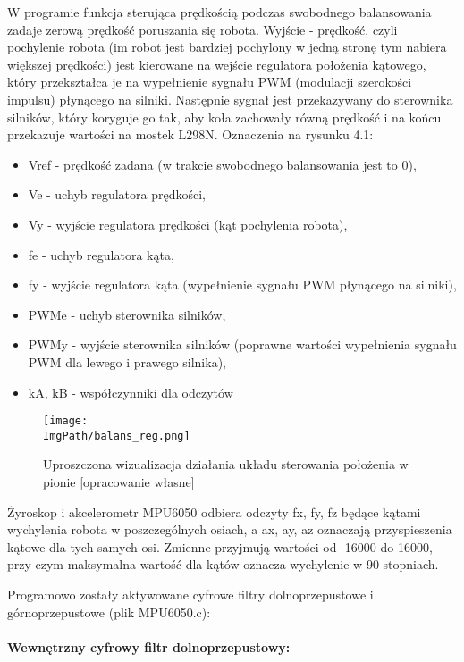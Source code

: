 \documentclass[a4paper,12pt,twoside,openany]{report}
\newcommand{\ImgPath}{.}
\begin{document}
W programie funkcja sterująca prędkością podczas swobodnego balansowania zadaje zerową prędkość poruszania się robota. Wyjście - prędkość, czyli pochylenie robota (im robot jest bardziej pochylony w jedną stronę tym nabiera większej prędkości) jest kierowane na wejście regulatora położenia kątowego, który przekształca je na wypełnienie sygnału PWM (modulacji szerokości impulsu) płynącego na silniki. Następnie sygnał jest przekazywany do sterownika silników, który koryguje go tak, aby koła zachowały równą prędkość i na końcu przekazuje wartości na mostek L298N. Oznaczenia na rysunku 4.1:
\begin{itemize}
\item Vref - prędkość zadana (w trakcie swobodnego balansowania jest to 0),
\item Ve - uchyb regulatora prędkości,
\item Vy - wyjście regulatora prędkości (kąt pochylenia robota),
\item fe - uchyb regulatora kąta,
\item fy - wyjście regulatora kąta (wypełnienie sygnału PWM płynącego na silniki),
\item PWMe - uchyb sterownika silników,
\item PWMy - wyjście sterownika silników (poprawne wartości wypełnienia sygnału PWM dla lewego i prawego silnika),
\item kA, kB - współczynniki dla odczytów
\end{itemize}

\begin{figure}[!htbp]
	\begin{center}
\centering
\texttt{[image: \\ImgPath/balans\_reg.png]}
\end{center}
	\caption{Uproszczona wizualizacja działania układu sterowania położenia w pionie [opracowanie własne]}
	\label{schematKomunikacji}
\end{figure}

Żyroskop i akcelerometr MPU6050 odbiera odczyty fx, fy, fz będące kątami wychylenia robota w poszczególnych osiach, a ax, ay, az oznaczają przyspieszenia kątowe dla tych samych osi. Zmienne przyjmują wartości od -16000 do 16000, przy czym maksymalna wartość dla kątów oznacza wychylenie w 90 stopniach. 

Programowo zostały aktywowane cyfrowe filtry dolnoprzepustowe i górnoprzepustowe (plik MPU6050.c):\\
\\
\noindent\textbf{Wewnętrzny cyfrowy filtr dolnoprzepustowy:} 
\end{document}
